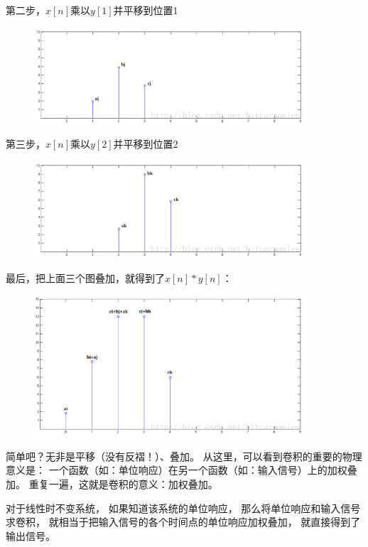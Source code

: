 第二步，$x[n]$乘以$y[1]$并平移到位置1 
\begin{figure}[hpbt]
  \centering
  \includegraphics[width=0.9\textwidth]{图像及其数学与物理背景/Figures/卷积2}
\end{figure}

第三步，$x[n]$乘以$y[2]$并平移到位置2 
\begin{figure}[hpbt]
  \centering
  \includegraphics[width=0.9\textwidth]{图像及其数学与物理背景/Figures/卷积3}
\end{figure}

最后，把上面三个图叠加，就得到了$x[n] * y[n]$：
\begin{figure}[hpbt]
  \centering
  \includegraphics[width=0.9\textwidth]{图像及其数学与物理背景/Figures/卷积4}
\end{figure}

简单吧？无非是平移（没有反褶！）、叠加。%
从这里，可以看到卷积的重要的物理意义是：%
一个函数（如：单位响应）在另一个函数（如：输入信号）上的加权叠加。%
重复一遍，这就是卷积的意义：加权叠加。%


对于线性时不变系统，%
如果知道该系统的单位响应，%
那么将单位响应和输入信号求卷积，%
就相当于把输入信号的各个时间点的单位响应加权叠加，%
就直接得到了输出信号。

